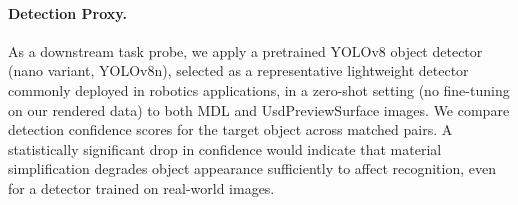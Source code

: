 \paragraph{Detection Proxy.}
As a downstream task probe, we apply a pretrained YOLOv8 object detector
(nano variant, YOLOv8n), selected as a representative lightweight detector
commonly deployed in robotics applications, in a
zero-shot setting (no fine-tuning on our rendered data) to both MDL and
UsdPreviewSurface images. We compare detection confidence scores for the
target object across matched pairs. A statistically significant drop in
confidence would indicate that material simplification degrades object
appearance sufficiently to affect recognition, even for a detector trained on
real-world images.
